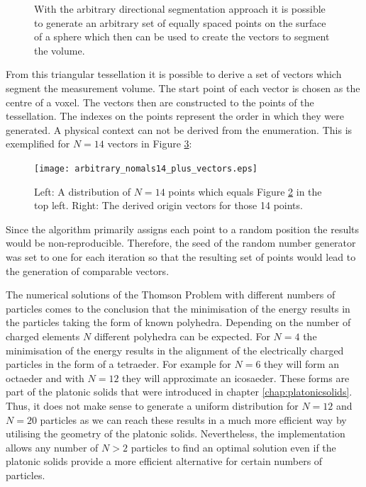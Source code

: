 \begin{figure}[H]
\begin{subfigure}[b]{0.4\textwidth}
         \label{fig:arbitary_n200}
     \end{subfigure} 
        \caption{With the arbitrary directional segmentation approach it is possible to generate an arbitrary set of equally spaced points on the surface of a sphere which then can be used to create the vectors to segment the volume. }
        \label{fig:arbitrary_example}
\end{figure}

From this triangular tessellation it is possible to derive a set of vectors which segment the measurement volume. The start point of each vector is chosen as the centre of a voxel. The vectors then are constructed to the points of the tessellation. The indexes on the points represent the order in which they were generated. A physical context can not be derived from the enumeration.  This is exemplified for $N = 14$ vectors in Figure \ref{vectors_from_points}:

\begin{figure}[H]
    \texttt{[image: arbitrary\_nomals14\_plus\_vectors.eps]}
    \caption{Left: A distribution of $N = 14$ points which equals Figure \ref{fig:arbitrary_example} in the top left. Right: The derived origin vectors for those 14 points.}
    \label{vectors_from_points}
\end{figure}


Since the algorithm primarily assigns each point to a random position the results would be non-reproducible. Therefore, the seed of the random number generator was set to one for each iteration so that the resulting set of points would lead to the generation of comparable vectors. 

The numerical solutions of the Thomson Problem with different numbers of particles comes to the conclusion that the minimisation of the energy results in the particles taking the form of known polyhedra. Depending on the number of charged elements $N$ different polyhedra can be expected. For $N = 4$ the minimisation of the energy results in the alignment of the electrically charged particles in the form of a tetraeder. For example for $N = 6$ they will form an octaeder and with $N = 12$ they will approximate an icosaeder. These forms are part of the platonic solids that were introduced in chapter \ref{chap:platonicsolids}. Thus, it does not make sense to generate a uniform distribution for $N = 12$ and $N = 20$ particles as we can reach these results in a much more efficient way by utilising the geometry of the platonic solids. Nevertheless, the implementation allows any number of $N > 2$ particles to find an optimal solution even if the platonic solids provide a more efficient alternative for certain numbers of particles.


